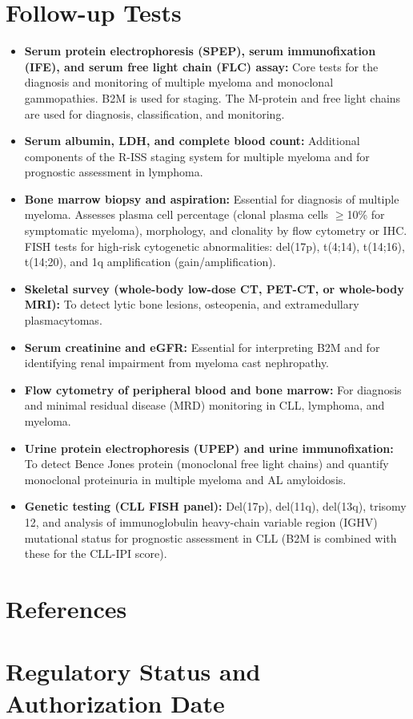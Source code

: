 \section*{Follow-up Tests}
\begin{itemize}
  \item \textbf{Serum protein electrophoresis (SPEP), serum immunofixation (IFE), and serum free light chain (FLC) assay:} Core tests for the diagnosis and monitoring of multiple myeloma and monoclonal gammopathies. B2M is used for staging. The M-protein and free light chains are used for diagnosis, classification, and monitoring.
  \item \textbf{Serum albumin, LDH, and complete blood count:} Additional components of the R-ISS staging system for multiple myeloma and for prognostic assessment in lymphoma.
  \item \textbf{Bone marrow biopsy and aspiration:} Essential for diagnosis of multiple myeloma. Assesses plasma cell percentage (clonal plasma cells $\geq$10\% for symptomatic myeloma), morphology, and clonality by flow cytometry or IHC. FISH tests for high-risk cytogenetic abnormalities: del(17p), t(4;14), t(14;16), t(14;20), and 1q amplification (gain/amplification).
  \item \textbf{Skeletal survey (whole-body low-dose CT, PET-CT, or whole-body MRI):} To detect lytic bone lesions, osteopenia, and extramedullary plasmacytomas.
  \item \textbf{Serum creatinine and eGFR:} Essential for interpreting B2M and for identifying renal impairment from myeloma cast nephropathy.
  \item \textbf{Flow cytometry of peripheral blood and bone marrow:} For diagnosis and minimal residual disease (MRD) monitoring in CLL, lymphoma, and myeloma.
  \item \textbf{Urine protein electrophoresis (UPEP) and urine immunofixation:} To detect Bence Jones protein (monoclonal free light chains) and quantify monoclonal proteinuria in multiple myeloma and AL amyloidosis.
  \item \textbf{Genetic testing (CLL FISH panel):} Del(17p), del(11q), del(13q), trisomy 12, and analysis of immunoglobulin heavy-chain variable region (IGHV) mutational status for prognostic assessment in CLL (B2M is combined with these for the CLL-IPI score).
\end{itemize}

\section*{References}



\clearpage
\section*{Regulatory Status and Authorization Date}

\clearpage
